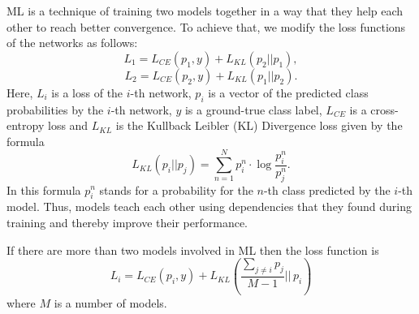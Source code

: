 \documentclass[conference]{IEEEtran}
\begin{document}
ML is a technique of training two models together in a way that they help each other to reach better convergence. To achieve that, we modify the loss functions of the networks as follows:
\begin{equation}
	L_1 = L_{CE}(p_1,y)+L_{KL}(p_2||p_1),
\end{equation}
\begin{equation}
	L_2 = L_{CE}(p_2,y)+L_{KL}(p_1||p_2).
\end{equation}
Here, $L_i$ is a loss of the $i$-th network, $p_i$ is a vector of the predicted class probabilities by the $i$-th network, $y$ is a ground-true class label, $L_{CE}$ is a cross-entropy loss and $L_{KL}$ is the Kullback Leibler (KL) Divergence loss given by the formula
\begin{equation}
	L_{KL}(p_i||p_j) = \sum_{n=1}^{N}p_i^n\cdot\log\frac{p_i^n}{p_j^n}.
\end{equation}
In this formula $p_i^n$ stands for a probability for the $n$-th class predicted by the $i$-th model. Thus, models teach each other using dependencies that they found during training and thereby improve their performance.

If there are more than two models involved in ML then the loss function is
\begin{equation}
	L_i = L_{CE}(p_i,y)+L_{KL}\left(\frac{\sum_{j\neq i} p_j}{M-1}||\,p_i\right)
\end{equation}
where $M$ is a number of models. 
\end{document}
